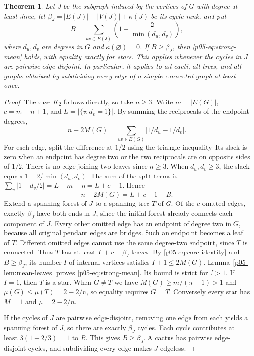 \documentclass[11pt,a4paper]{article}
\newtheorem{theorem}{Theorem}[section]
\begin{document}
\begin{theorem}\label{p05-thm:mean-core}
Let $J$ be the subgraph induced by the vertices of $G$ with degree at
least three, let $\beta_J=|E(J)|-|V(J)|+\kappa(J)$ be its cycle rank, and put
\[
 B=\sum_{uv\in E(J)}\left(1-\frac{2}{\min(d_u,d_v)}\right),
\]
where $d_u,d_v$ are degrees in $G$ and $\kappa(\varnothing)=0$.
If $B\ge\beta_J$, then \eqref{p05-eq:strong-mean} holds, with equality exactly
for stars. This applies whenever the cycles in $J$ are pairwise
edge-disjoint. In particular, it applies to all cacti, all trees,
and all graphs obtained by subdividing every edge of a simple connected
graph at least once.
\end{theorem}
\begin{proof}
The case $K_2$ follows directly, so take $n\ge3$.
Write $m=|E(G)|$, $c=m-n+1$, and $L=|\{v:d_v=1\}|$. By summing the
reciprocals of the endpoint degrees,
\[
 n-2M(G)=\sum_{uv\in E(G)}|1/d_u-1/d_v|.
\]
For each edge, split the difference at $1/2$ using the triangle
inequality. Its slack is zero when an endpoint has degree two or the two
reciprocals are on opposite sides of $1/2$. There is no edge joining two
leaves since $n\ge3$. When $d_u,d_v\ge3$, the slack equals
$1-2/\min(d_u,d_v)$. The sum of the split terms is
$\sum_v|1-d_v/2|=L+m-n=L+c-1$. Hence
\begin{equation}\label{p05-eq:core-identity}
 n-2M(G)=L+c-1-B.
\end{equation}
Extend a spanning forest of $J$ to a spanning tree $T$ of $G$.
Of the $c$ omitted edges, exactly $\beta_J$ have both ends in $J$,
since the initial forest already connects each component of $J$.
Every other omitted edge has an endpoint of degree two in $G$,
because all original pendant edges are bridges. Such an endpoint
becomes a leaf of $T$. Different omitted edges cannot use the same
degree-two endpoint, since $T$ is connected. Thus $T$ has at least
$L+c-\beta_J$ leaves. By \eqref{p05-eq:core-identity} and $B\ge\beta_J$, its number
$I$ of internal vertices satisfies $I+1\le2M(G)$.
Lemma~\ref{p05-lem:mean-leaves} proves \eqref{p05-eq:strong-mean}.
Its bound is strict for $I>1$. If $I=1$, then $T$ is a star.
When $G\ne T$ we have $M(G)\ge m/(n-1)>1$ and
$\mu(G)\le\mu(T)=2-2/n$, so equality requires $G=T$.
Conversely every star has $M=1$ and $\mu=2-2/n$.

If the cycles of $J$ are pairwise edge-disjoint, removing one edge
from each yields a spanning forest of $J$, so there are exactly $\beta_J$
cycles. Each cycle contributes at least $3(1-2/3)=1$ to $B$.
This gives $B\ge\beta_J$. A cactus has pairwise edge-disjoint cycles,
and subdividing every edge makes $J$ edgeless.
\end{proof}
\end{document}

